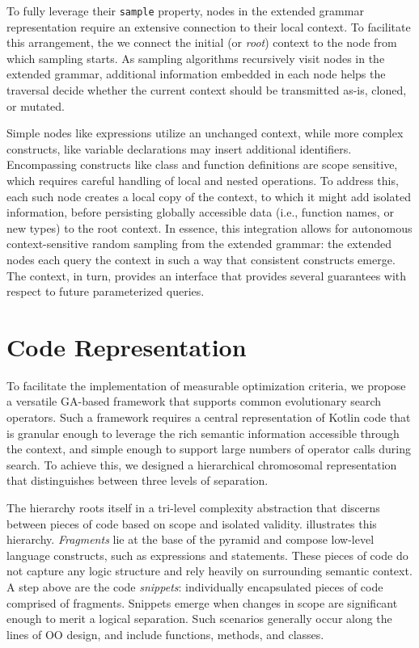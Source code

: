 To fully leverage their \texttt{sample} property, nodes in the 
extended grammar representation require an extensive connection to their local context.
To facilitate this arrangement, the we connect the initial (or \textit{root})
context to the node from which sampling starts.
As sampling algorithms recursively visit nodes in the extended grammar,
additional information embedded in each node helps the traversal decide
whether the current context should be transmitted as-is, cloned, or mutated.

Simple nodes like expressions utilize an unchanged context, while more complex
constructs, like variable declarations may insert additional identifiers.
Encompassing constructs like class and function definitions are scope sensitive,
which requires careful handling of local and nested operations.
To address this, each such node creates a local copy of the context, to
which it might add isolated information, before persisting globally accessible data
(i.e., function names, or new types) to the root context.
In essence, this integration allows for autonomous context-sensitive random sampling from the 
extended grammar: the extended nodes each query the context
in such a way that consistent constructs emerge.
The context, in turn, provides an interface that provides several guarantees with respect 
to future parameterized queries.

\section{\label{sec:repr} Code Representation}

To facilitate the implementation of measurable 
optimization criteria, we propose a versatile \gls{GA}-based framework
that supports common evolutionary search operators.
Such a framework requires a central representation of Kotlin code that is
granular enough to leverage the rich semantic information accessible through
the context, and simple enough to support large numbers of operator
calls during search.
To achieve this, we designed a hierarchical chromosomal representation
that distinguishes between three levels of separation.

The hierarchy roots itself in a tri-level
complexity abstraction that discerns between pieces of code
based on scope and isolated validity.
 illustrates this hierarchy.
\textit{Fragments} lie at the base of the pyramid and compose low-level 
language constructs, such as expressions and statements.
These pieces of code do not capture any logic
structure and rely heavily on surrounding semantic context.
A step above are the code \textit{snippets}: individually encapsulated
pieces of code comprised of fragments.
Snippets emerge when changes in scope are significant enough to
merit a logical separation.
Such scenarios generally occur along the lines of \gls{OO} design,
and include functions, methods, and classes.


